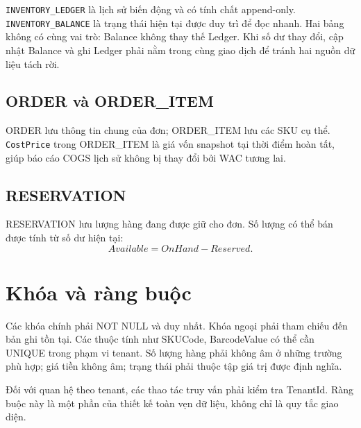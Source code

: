\texttt{INVENTORY\_LEDGER} là lịch sử biến động và có tính chất append-only. \texttt{INVENTORY\_BALANCE} là trạng thái hiện tại được duy trì để đọc nhanh. Hai bảng không có cùng vai trò: Balance không thay thế Ledger. Khi số dư thay đổi, cập nhật Balance và ghi Ledger phải nằm trong cùng giao dịch để tránh hai nguồn dữ liệu tách rời.

\subsection{ORDER và ORDER\_ITEM}

ORDER lưu thông tin chung của đơn; ORDER\_ITEM lưu các SKU cụ thể. \texttt{CostPrice} trong ORDER\_ITEM là giá vốn snapshot tại thời điểm hoàn tất, giúp báo cáo COGS lịch sử không bị thay đổi bởi WAC tương lai.

\subsection{RESERVATION}

RESERVATION lưu lượng hàng đang được giữ cho đơn. Số lượng có thể bán được tính từ số dư hiện tại:
\[
Available = OnHand - Reserved.
\]

\section{Khóa và ràng buộc}

Các khóa chính phải NOT NULL và duy nhất. Khóa ngoại phải tham chiếu đến bản ghi tồn tại. Các thuộc tính như SKUCode, BarcodeValue có thể cần UNIQUE trong phạm vi tenant. Số lượng hàng phải không âm ở những trường phù hợp; giá tiền không âm; trạng thái phải thuộc tập giá trị được định nghĩa.

Đối với quan hệ theo tenant, các thao tác truy vấn phải kiểm tra TenantId. Ràng buộc này là một phần của thiết kế toàn vẹn dữ liệu, không chỉ là quy tắc giao diện.
